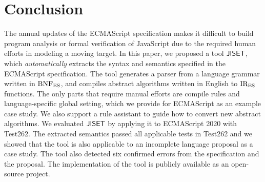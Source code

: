 \section{Conclusion}\label{sec:conclude}
The annual updates of the ECMAScript specification makes it difficult to
build program analysis or formal verification of JavaScript due to the
required human efforts in modeling a moving target.  In this paper,
we proposed a tool \( \text{\sf JISET} \), which \textit{automatically} extracts the
syntax and semantics specified in the ECMAScript specification.  The tool
generates a parser from a language grammar written in \( \text{BNF}_{\text{ES}} \), and
compiles abstract algorithms written in English to \( \text{IR}_\text{ES} \) functions.
The only parts that require manual efforts are compile rules and
language-specific global setting, which we provide for ECMAScript
as an example case study.  We also support a rule assistant to guide
how to convert new abstract algorithms.  We evaluated \( \text{\sf JISET} \) by
applying it to ECMAScript 2020 with Test262.  The extracted semantics
passed all  applicable tests in Test262 and we showed
that the tool is also applicable to an incomplete language proposal as
a case study.  The tool also detected six confirmed errors from the
specification and the proposal. The implementation of the tool is
publicly available as an open-source project.
